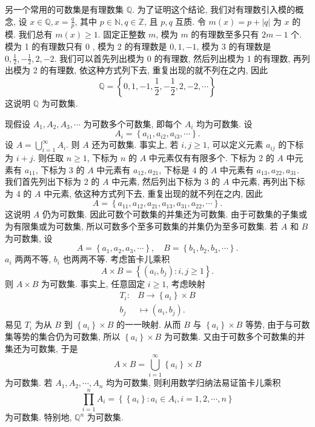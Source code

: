 \documentclass[openany]{ctexbook}
\theoremstyle{kaiti}
\theoremstyle{normal}
\begin{document}
另一个常用的可数集是有理数集 $\mathbb{Q}$. 为了证明这个结论, 我们对有理数引入模的概念, 设 $x \in \mathbb{Q}, x=\frac{q}{p}$, 其中 $p \in \mathbb{N}, q \in \mathbb{Z}$, 且 $p, q$ 互质. 令 $m(x)=p+|q|$ 为 $x$ 的模. 我们总有 $m(x) \geqslant 1$. 固定正整数 $m$, 模为 $m$ 的有理数至多只有 $2 m-1$ 个. 模为 1 的有理数只有 0 , 模为 2 的有理数是 $0,1,-1$, 模为 3 的有理数是 $0, \frac{1}{2},-\frac{1}{2}, 2,-2$. 我们可以首先列出模为 0 的有理数, 然后列出模为 1 的有理数, 再列出模为 2 的有理数, 依这种方式列下去, 重复出现的就不列在之内, 因此
$$
\mathbb{Q}=\left\{0,1,-1, \frac{1}{2},-\frac{1}{2}, 2,-2, \cdots\right\}
$$
这说明 $\mathbb{Q}$ 为可数集.

现假设 $A_1, A_2, A_3, \cdots$ 为可数多个可数集, 即每个 $A_{i}$ 均为可数集. 设
$$
A_{i}=\left\{a_{i 1}, a_{i 2}, a_{i 3}, \cdots\right\}.
$$
设 $A=\bigcup_{i=1}^{\infty} A_{i}$. 则 $A$ 还为可数集. 事实上, 若 $i, j \geqslant 1$, 可以定义元素 $a_{i j}$ 的下标为 $i+j$. 则任取 $n \geqslant 1$, 下标为 $n$ 的 $A$ 中元素仅有有限多个. 下标为 2 的 $A$ 中元素有 $a_{11}$, 下标为 3 的 $A$ 中元素有 $a_{12}, a_{21}$, 下标是 4 的 $A$ 中元素有 $a_{13}, a_{22}, a_{31}$. 我们首先列出下标为 2 的 $A$ 中元素, 然后列出下标为 3 的 $A$ 中元素, 再列出下标为 4 的 $A$ 中元素, 依这种方式列下去, 重复出现的就不列在之内, 因此
$$
A=\left\{a_{11}, a_{12}, a_{21}, a_{13}, a_{31}, a_{22}, \cdots\right\}.
$$
这说明 $A$ 仍为可数集. 因此可数个可数集的并集还为可数集. 由于可数集的子集或为有限集或为可数集, 所以可数多个至多可数集的并集仍为至多可数集.
若 $A$ 和 $B$ 为可数集, 设
$$
A=\left\{a_1, a_2, a_3, \cdots\right\}, \quad B=\left\{b_1, b_2, b_3, \cdots\right\}.
$$
$a_{i}$ 两两不等, $b_{i}$ 也两两不等. 考虑笛卡儿乘积
$$
A \times B=\left\{\left(a_{i}, b_{j}\right): i, j \geqslant 1\right\}.
$$
则 $A \times B$ 为可数集. 事实上, 任意固定 $i \geqslant 1$, 考虑映射
$$
\begin{aligned}
T_{i}: & B \rightarrow\left\{a_{i}\right\} \times B \\
b_{j} & \mapsto\left(a_{i}, b_{j}\right).
\end{aligned}
$$
易见 $T_{i}$ 为从 $B$ 到 $\left\{a_{i}\right\} \times B$ 的一一映射. 从而 $B$ 与 $\left\{a_{i}\right\} \times B$ 等势, 由于与可数集等势的集合仍为可数集, 所以 $\left\{a_{i}\right\} \times B$ 为可数集. 又由于可数多个可数集的并集还为可数集, 于是
$$
A \times B=\bigcup_{i=1}^{\infty}\left\{a_{i}\right\} \times B
$$
为可数集. 若 $A_1, A_2, \cdots, A_n$ 均为可数集, 则利用数学归纳法易证笛卡儿乘积
$$
\prod_{i=1}^n A_{i}=\left\{\left\{a_{i}\right\}: a_{i} \in A_{i}, i=1,2, \cdots, n\right\}
$$
为可数集. 特别地, $\mathbb{Q}^n$ 为可数集.
\end{document}

